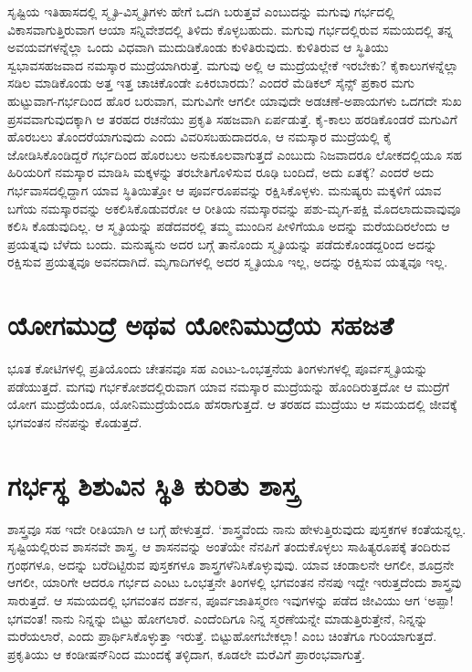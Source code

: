 ಸೃಷ್ಟಿಯ ಇತಿಹಾಸದಲ್ಲಿ ಸ್ಮೃತಿ-ವಿಸ್ಮೃತಿಗಳು ಹೇಗೆ ಒದಗಿ ಬರುತ್ತವೆ ಎಂಬುದನ್ನು ಮಗುವು ಗರ್ಭದಲ್ಲಿ ವಿಕಾಸವಾಗುತ್ತಿರುವಾಗ ಆಯಾ ಸನ್ನಿವೇಶದಲ್ಲಿ ತಿಳಿದು ಕೊಳ್ಳಬಹುದು. ಮಗುವು ಗರ್ಭದಲ್ಲಿರುವ ಸಮಯದಲ್ಲಿ ತನ್ನ ಅವಯವಗಳನ್ನೆಲ್ಲಾ ಒಂದು ವಿಧವಾಗಿ ಮುದುಡಿಕೊಂಡು ಕುಳಿತಿರುವುದು. ಕುಳಿತಿರುವ ಆ ಸ್ಥಿತಿಯು ಸ್ವಭಾವಸಹಜವಾದ ನಮಸ್ಕಾರ ಮುದ್ರೆಯಾಗಿರುತ್ತೆ. ಮಗುವು ಅಲ್ಲಿ ಆ ಮುದ್ರೆಯಲ್ಲೇಕೆ ಇರಬೇಕು? ಕೈಕಾಲುಗಳನ್ನೆಲ್ಲಾ ಸಡಿಲ ಮಾಡಿಕೊಂಡು ಅತ್ತ ಇತ್ತ ಚಾಚಿಕೊಂಡೇ ಏಕಿರಬಾರದು? ಎಂದರೆ ಮೆಡಿಕಲ್ ಸೈನ್ಸ್  ಪ್ರಕಾರ ಮಗು ಹುಟ್ಟುವಾಗ-ಗರ್ಭದಿಂದ ಹೊರ ಬರುವಾಗ, ಮಗುವಿಗೇ ಆಗಲೀ ಯಾವುದೇ ಅಡಚಣೆ-ಅಪಾಯಗಳು ಒದಗದೇ ಸುಖ ಪ್ರಸವವಾಗುವುದಕ್ಕಾಗಿ ಆ ತರಹದ ರಚನೆಯು ಪ್ರಕೃತಿ ಸಹಜವಾಗಿ ಏರ್ಪಡುತ್ತೆ. ಕೈ-ಕಾಲು ಹರಡಿಕೊಂಡರೆ ಮಗುವಿಗೆ ಹೊರಬಲು ತೊಂದರೆಯಾಗುವುದು ಎಂದು ವಿವರಿಸಬಹುದಾದರೂ, ಆ ನಮಸ್ಕಾರ ಮುದ್ರೆಯಲ್ಲಿ ಕೈ ಜೋಡಿಸಿಕೊಂಡಿದ್ದರೆ
ಗರ್ಭದಿಂದ ಹೊರಬಲು ಅನುಕೂಲವಾಗುತ್ತದೆ ಎಂಬುದು ನಿಜವಾದರೂ ಲೋಕದಲ್ಲಿಯೂ ಸಹ ಹಿರಿಯರಿಗೆ ನಮಸ್ಕಾರ ಮಾಡಿಸಿ ಮಕ್ಕಳನ್ನು ತರಬೇತಿಗೊಳಿಸುವ ರೂಢಿ ಬಂದಿದೆ, ಅದು ಏತಕ್ಕೆ? ಎಂದರೆ ಅದು ಗರ್ಭವಾಸದಲ್ಲಿದ್ದಾಗ ಯಾವ ಸ್ಥಿತಿಯಿತ್ತೋ ಆ ಪೂರ್ವರೂಪವನ್ನು ರಕ್ಷಿಸಿಕೊಳ್ಳಳು. ಮನುಷ್ಯರು ಮಕ್ಕಳಿಗೆ ಯಾವ ಬಗೆಯ ನಮಸ್ಕಾರವನ್ನು ಅಕಲಿಸಿಕೊಡುವರೋ ಆ ರೀತಿಯ ನಮಸ್ಕಾರವನ್ನು ಪಶು-ಮೃಗ-ಪಕ್ಷಿ ಮೊದಲಾದುವಾವುವೂ ಕಲಿಸಿ ಕೊಡುವುದಿಲ್ಲ. ಆ ಸ್ಮೃತಿಯನ್ನು ಪಡೆದವರಲ್ಲಿ ತಮ್ಮ ಮುಂದಿನ ಪೀಳಿಗೆಯೂ ಅದನ್ನು ಮರೆಯದಿರಲೆಂದು ಆ ಪ್ರಯತ್ನವು ಬೆಳೆದು ಬಂದು. ಮನುಷ್ಯನು ಅದರ ಬಗ್ಗೆ ತಾನೊಂದು ಸ್ಮೃತಿಯನ್ನು ಪಡೆದುಕೊಂಡದ್ದರಿಂದ ಅದನ್ನು ರಕ್ಷಿಸುವ ಪ್ರಯತ್ನವೂ ಅವನದಾಗಿದೆ. ಮೃಗಾದಿಗಳಲ್ಲಿ ಅದರ ಸ್ಮೃತಿಯೂ ಇಲ್ಲ, ಅದನ್ನು ರಕ್ಷಿಸುವ ಯತ್ನವೂ ಇಲ್ಲ.

\section*{ಯೋಗಮುದ್ರೆ ಅಥವ ಯೋನಿಮುದ್ರೆಯ ಸಹಜತೆ}

ಭೂತ ಕೋಟಿಗಳಲ್ಲಿ ಪ್ರತಿಯೊಂದು ಚೇತನವೂ ಸಹ ಎಂಟು-ಒಂಭತ್ತನೆಯ ತಿಂಗಳುಗಳಲ್ಲಿ ಪೂರ್ವಸ್ಮೃತಿಯನ್ನು ಪಡೆಯುತ್ತದೆ. ಮಗವು ಗರ್ಭಕೋಶದಲ್ಲಿರುವಾಗ ಯಾವ ನಮಸ್ಕಾರ ಮುದ್ರೆಯನ್ನು ಹೊಂದಿರುತ್ತದೋ ಆ ಮುದ್ರೆಗೆ ಯೋಗ ಮುದ್ರೆಯೆಂದೂ, ಯೋನಿಮುದ್ರೆಯೆಂದೂ ಹೆಸರಾಗುತ್ತದೆ. ಆ ತರಹದ ಮುದ್ರೆಯು ಆ ಸಮಯದಲ್ಲಿ ಜೀವಕ್ಕೆ ಭಗವಂತನ ನೆನಪನ್ನು ಕೊಡುತ್ತದೆ. 

\section*{ಗರ್ಭಸ್ಥ ಶಿಶುವಿನ ಸ್ಥಿತಿ ಕುರಿತು ಶಾಸ್ತ್ರ}

ಶಾಸ್ತ್ರವೂ ಸಹ ಇದೇ ರೀತಿಯಾಗಿ ಆ ಬಗ್ಗೆ ಹೇಳುತ್ತದೆ. `ಶಾಸ್ತ್ರವೆಂದು ನಾನು ಹೇಳುತ್ತಿರುವುದು ಪುಸ್ತಕಗಳ ಕಂತೆಯನ್ನಲ್ಲ. ಸೃಷ್ಟಿಯಲ್ಲಿರುವ ಶಾಸನವೇ ಶಾಸ್ತ್ರ. ಆ ಶಾಸನವನ್ನು ಅಂತೆಯೇ ನೆನಪಿಗೆ ತಂದುಕೊಳ್ಳಲು ಸಾಹಿತ್ಯರೂಪಕ್ಕೆ ತಂದಿರುವ ಗ್ರಂಥಗಳೂ, ಅದನ್ನು ಬರೆದಿಟ್ಟಿರುವ ಪುಸ್ತಕಗಳೂ ಶಾಸ್ತ್ರಗಳೆನಿಸಿಕೊಳ್ಳುವುವು. ಯಾವ ಚಂಡಾಲನೇ ಆಗಲೀ, ಶೂದ್ರನೇ ಆಗಲೀ, ಯಾರಿಗೇ ಆದರೂ ಗರ್ಭದ ಎಂಟು ಒಂಭತ್ತನೇ ತಿಂಗಳಲ್ಲಿ ಭಗವಂತನ ನೆನಪು ಇದ್ದೇ ಇರುತ್ತದೆಂದು ಶಾಸ್ತ್ರವು ಸಾರುತ್ತದೆ. ಆ ಸಮಯದಲ್ಲಿ ಭಗವಂತನ ದರ್ಶನ, ಪೂರ್ವಜಾತಿಸ್ಮರಣ ಇವುಗಳನ್ನು ಪಡೆದ ಜೀವಿಯು ಆಗ `ಅಪ್ಪಾ! ಭಗವಂತ! ನಾನು ನಿನ್ನನ್ನು ಬಿಟ್ಟು ಹೋಗಲಾರೆ. ಎಂದೆಂದಿಗೂ ನಿನ್ನ ಸ್ಮರಣೆಯನ್ನೇ ಮಾಡುತ್ತಿರುತ್ತೇನೆ, ನಿನ್ನನ್ನು ಮರೆಯಲಾರೆ, ಎಂದು ಪ್ರಾರ್ಥಿಸಿಕೊಳ್ಳುತ್ತಾ ಇರುತ್ತೆ. ಬಿಟ್ಟುಹೋಗಬೇಕಲ್ಲಾ! ಎಂಬ ಚಿಂತೆಗೂ ಗುರಿಯಾಗುತ್ತದೆ. ಪ್ರಕೃತಿಯು ಆ ಕಂಡೀಷನ್‌ನಿಂದ ಮುಂದಕ್ಕೆ ತಳ್ಳಿದಾಗ, ಕೂಡಲೇ ಮರೆವಿಗೆ ಪ್ರಾರಂಭವಾಗುತ್ತೆ.

